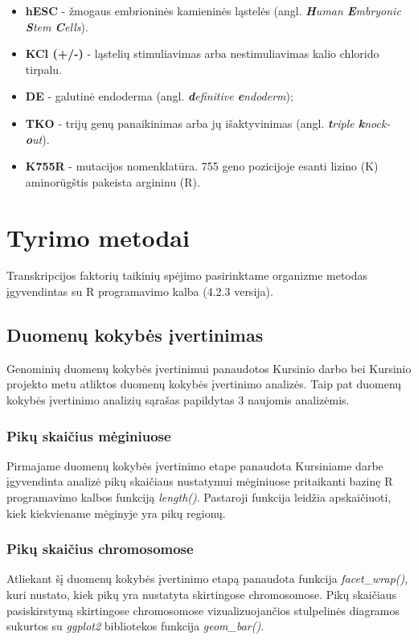 \documentclass[12pt]{article}
\begin{document}
\begin{itemize}
    \item \textbf{hESC} - žmogaus embrioninės kamieninės ląstelės
          (angl. \emph{\textbf{H}uman \textbf{E}mbryonic \textbf{S}tem
          \textbf{C}ells}).
    \item \textbf{KCl (+/-)} - ląstelių stimuliavimas arba nestimuliavimas kalio
          chlorido tirpalu.
    \item \textbf{DE} - galutinė endoderma (angl. \emph{\textbf{d}efinitive
          \textbf{e}ndoderm});
    \item \textbf{TKO} - trijų genų panaikinimas arba jų išaktyvinimas
          (angl. \emph{\textbf{t}riple \textbf{k}nock-\textbf{o}ut}).
    \item \textbf{K755R} - mutacijos nomenklatūra. 755 geno pozicijoje esanti
          lizino (K) aminorūgštis pakeista argininu (R).
\end{itemize}

\newpage


\section{Tyrimo metodai}
Transkripcijos faktorių taikinių spėjimo pasirinktame organizme metodas
įgyvendintas su R programavimo kalba\cite{R} (4.2.3 versija).

\subsection{Duomenų kokybės įvertinimas}
Genominių duomenų kokybės įvertinimui panaudotos Kursinio darbo bei Kursinio
projekto metu atliktos duomenų kokybės įvertinimo analizės. Taip pat
duomenų kokybės įvertinimo analizių sąrašas papildytas 3 naujomis analizėmis.

\subsubsection*{Pikų skaičius mėginiuose}
Pirmajame duomenų kokybės įvertinimo etape panaudota Kursiniame darbe
įgyvendinta analizė pikų skaičiaus nustatymui mėginiuose pritaikanti bazinę R
programavimo kalbos funkciją \emph{length()}. Pastaroji funkcija leidžia
apskaičiuoti, kiek kiekviename mėginyje yra pikų regionų.

\subsubsection*{Pikų skaičius chromosomose}
Atliekant šį duomenų kokybės įvertinimo etapą panaudota funkcija
\emph{facet\_wrap()}, kuri nustato, kiek pikų yra nustatyta skirtingose
chromosomose. Pikų skaičiaus pasiskirstymą skirtingose chromosomose
vizualizuojančios stulpelinės diagramos sukurtos su \emph{ggplot2}\cite{GGPLOT2}
bibliotekos funkcija \emph{geom\_bar()}.
\end{document}
